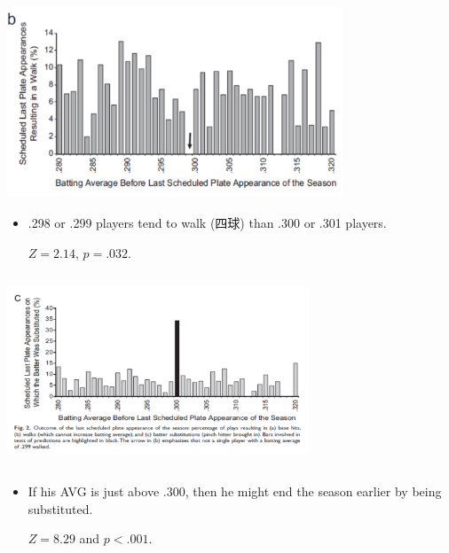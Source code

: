 \documentclass[dvipdfmx,12pt]{beamer}
\begin{document}
\begin{frame}

\begin{center}

\includegraphics[width=10cm,height=5.75cm]{Pope_Simonsohn_F2B.pdf}

\end{center}

 \begin{itemize}
 
 \item .298 or .299 players tend to walk (四球) than .300 or .301 players.
 
 $Z=2.14$, $p=.032$.
 
 \end{itemize}

\end{frame}

\begin{frame}

\begin{center}

\includegraphics[width=9cm,height=5.75cm]{Pope_Simonsohn_F2C.pdf}

\end{center}

 \begin{itemize}
 
 \item If his AVG is just above .300, then he might end the season earlier by being substituted.
 
 $Z=8.29$ and $p<.001$.
 
 \end{itemize}

\end{frame}
\end{document}
